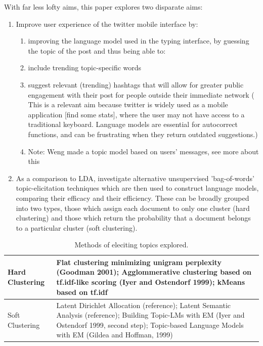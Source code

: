 \documentclass{article}
\begin{document}
With far less lofty aims, this paper explores two disparate aims:
\begin{enumerate}
	\item Improve user experience of the twitter mobile interface by:
	\begin{enumerate}
		\item improving the language model used in the typing interface, by guessing the topic of the post and thus being able to:
		\item include trending topic-specific words
		\item suggest relevant (trending) hashtags that will allow for greater public engagement with their post for people outside their immediate network (		This is a relevant aim because twitter is widely used as a mobile application [find some stats], where the user may not have access to a traditional keyboard. Language models are essential for autocorrect functions, and can be frustrating when they return outdated suggestions.)
		\item Note: Weng made a topic model based on users' messages, see more about this
	\end{enumerate}
	\item As a comparison to LDA, investigate alternative unsupervised 'bag-of-words' topic-elicitation techniques which are then used to construct language models, comparing their efficacy and their efficiency.  These can be broadly grouped into two types, those which assign each document to only one cluster (hard clustering) and those which return the probability that a document belongs to a particular cluster (soft clustering).
\end{enumerate}
 
 \begin{center}
 	\begin{table}
 	\begin{tabular}{|p{3cm}|p{8cm}|}
 		\hline
 		Hard Clustering &  Flat clustering minimizing unigram perplexity (Goodman 2001); Agglommerative clustering based on tf.idf-like scoring (Iyer and Ostendorf 1999); kMeans based on tf.idf  \\
		\hline
 		Soft Clustering &  Latent Dirichlet Allocation (reference); Latent Semantic Analysis (reference); Building Topic-LMs with EM (Iyer and Ostendorf 1999, second step); Topic-based Language Models with EM (Gildea and Hoffman, 1999) \\
 		\hline	
 	\end{tabular}
	\caption{Methods of eleciting topics explored.}	
 	\end{table}
 \end{center}
 
\end{document}
